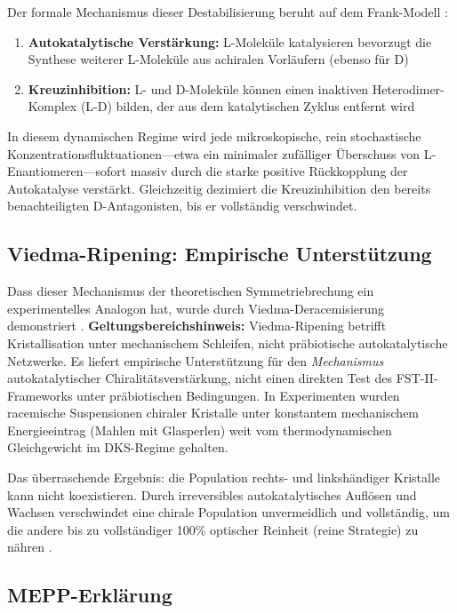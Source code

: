 \documentclass[12pt,a4paper]{article}
\theoremstyle{remark}
\begin{document}
Der formale Mechanismus dieser Destabilisierung beruht auf dem Frank-Modell \citep{Frank1953}:
\begin{enumerate}
    \item \textbf{Autokatalytische Verst\"arkung:} L-Molek\"ule katalysieren bevorzugt die Synthese weiterer L-Molek\"ule aus achiralen Vorl\"aufern (ebenso f\"ur D)
    \item \textbf{Kreuzinhibition:} L- und D-Molek\"ule k\"onnen einen inaktiven Heterodimer-Komplex (L-D) bilden, der aus dem katalytischen Zyklus entfernt wird \citep{Biochirality}
\end{enumerate}

In diesem dynamischen Regime wird jede mikroskopische, rein stochastische Konzentrationsfluktuationen---etwa ein minimaler zuf\"alliger \"Uberschuss von L-Enantiomeren---sofort massiv durch die starke positive R\"uckkopplung der Autokatalyse verst\"arkt. Gleichzeitig dezimiert die Kreuzinhibition den bereits benachteiligten D-Antagonisten, bis er vollst\"andig verschwindet.

\subsection{Viedma-Ripening: Empirische Unterst\"utzung}

Dass dieser Mechanismus der theoretischen Symmetriebrechung ein experimentelles Analogon hat, wurde durch Viedma-Deracemisierung demonstriert \citep{HomochiralityThermo}. \textbf{Geltungsbereichshinweis:} Viedma-Ripening betrifft Kristallisation unter mechanischem Schleifen, nicht pr\"abiotische autokatalytische Netzwerke. Es liefert empirische Unterst\"utzung f\"ur den \emph{Mechanismus} autokatalytischer Chiralit\"atsverst\"arkung, nicht einen direkten Test des FST-II-Frameworks unter pr\"abiotischen Bedingungen. In Experimenten wurden racemische Suspensionen chiraler Kristalle unter konstantem mechanischem Energieeintrag (Mahlen mit Glasperlen) weit vom thermodynamischen Gleichgewicht im DKS-Regime gehalten.

Das \"uberraschende Ergebnis: die Population rechts- und linksh\"andiger Kristalle kann nicht koexistieren. Durch irreversibles autokatalytisches Aufl\"osen und Wachsen verschwindet eine chirale Population unvermeidlich und vollst\"andig, um die andere bis zu vollst\"andiger 100\% optischer Reinheit (reine Strategie) zu n\"ahren \citep{HomochiralityThermo}.

\subsection{MEPP-Erkl\"arung}
\end{document}
